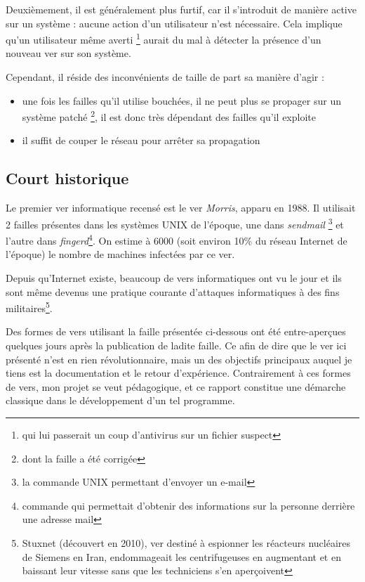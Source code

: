 \documentclass[]{projet-M1}
\begin{document}
Deuxièmement, il est généralement plus furtif, car il s'introduit de manière active sur un système : aucune action d'un utilisateur n'est nécessaire. Cela implique qu'un utilisateur même averti \footnote{qui lui passerait un coup d'antivirus sur un fichier suspect} aurait du mal à détecter la présence d'un nouveau ver sur son système. 

Cependant, il réside des inconvénients de taille de part sa manière d'agir : 
\begin{itemize}
\item une fois les \glspl{faille} qu'il utilise bouchées, il ne peut plus se propager sur un système patché \footnote{dont la faille a été corrigée}, il est donc très dépendant des \glspl{faille} qu'il exploite
\item il suffit de couper le réseau pour arrêter sa propagation
\end{itemize}

\subsection{Court historique}
Le premier ver informatique recensé est le ver \emph{Morris}, apparu en 1988. Il utilisait 2 \glspl{faille} présentes dans les systèmes \gls{UNIX} de l'époque, une dans \emph{sendmail} \footnote{la commande \gls{UNIX} permettant d'envoyer un e-mail} et l'autre dans \emph{fingerd}\footnote{commande qui permettait d'obtenir des informations sur la personne derrière une adresse mail}. On estime à 6000 (soit environ 10\% du réseau Internet de l'époque) le nombre de machines infectées par ce ver.

Depuis qu'Internet existe, beaucoup de vers informatiques ont vu le jour et ils sont même devenus une pratique courante d'attaques informatiques à des fins militaires\footnote{Stuxnet (découvert en 2010), ver destiné à espionner les réacteurs nucléaires de Siemens en Iran, endommageait les centrifugeuses en augmentant et en baissant leur vitesse sans que les techniciens s'en aperçoivent }.

Des formes de vers utilisant la faille présentée ci-dessous ont été entre-aperçues quelques jours après la publication de ladite faille. Ce afin de dire que le ver ici présenté n'est en rien révolutionnaire, mais un des objectifs principaux auquel je tiens est la documentation et le retour d'expérience. Contrairement à ces formes de vers, mon projet se veut pédagogique, et ce rapport constitue une démarche classique dans le développement d'un tel programme. 
\end{document}
